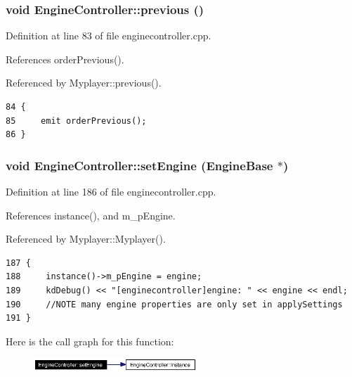 \subsubsection{\setlength{\rightskip}{0pt plus 5cm}void Engine\-Controller::previous ()\hspace{0.3cm}{\tt  [slot]}}\label{classEngineController_EngineControlleri0}




Definition at line 83 of file enginecontroller.cpp.

References order\-Previous().

Referenced by Myplayer::previous().



\footnotesize\begin{verbatim}84 {
85     emit orderPrevious();
86 }
\end{verbatim}\normalsize 
{}
\subsubsection{\setlength{\rightskip}{0pt plus 5cm}void Engine\-Controller::set\-Engine ({\bf Engine\-Base} $\ast$)\hspace{0.3cm}{\tt  [static]}}\label{classEngineController_EngineControllere2}




Definition at line 186 of file enginecontroller.cpp.

References instance(), and m\_\-p\-Engine.

Referenced by Myplayer::Myplayer().



\footnotesize\begin{verbatim}187 {
188     instance()->m_pEngine = engine;
189     kdDebug() << "[enginecontroller]engine: " << engine << endl;
190     //NOTE many engine properties are only set in applySettings
191 }
\end{verbatim}\normalsize 


Here is the call graph for this function:\begin{figure}[H]
\begin{center}
\leavevmode
\includegraphics[width=174pt]{classEngineController_EngineControllere2_cgraph}
\end{center}
\end{figure}
